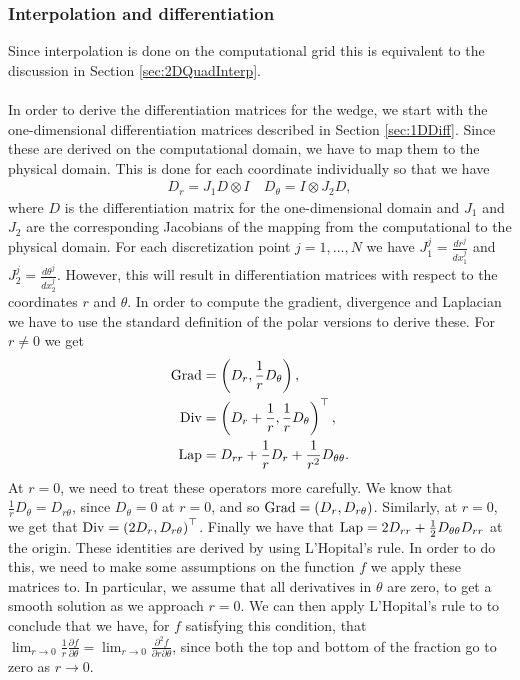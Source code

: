 \subsubsection*{Interpolation and differentiation}
Since interpolation is done on the computational grid this is equivalent to the discussion in Section \ref{sec:2DQuadInterp}.
\\
\\
In order to derive the differentiation matrices for the wedge, we start with the one-dimensional differentiation matrices described in Section \ref{sec:1DDiff}. Since these are derived on the computational domain, we have to map them to the physical domain. This is done for each coordinate individually so that we have
\begin{align*}
	D_r = J_1D \otimes I \quad 	D_\theta =I \otimes J_2D,
\end{align*} 
where $D$ is the differentiation matrix for the one-dimensional domain and $J_1$ and $J_2$  are the corresponding Jacobians of the mapping from the computational to the physical domain. For each discretization point $j = 1,...,N$ we have $ J_1^j= \frac{dr^j}{dx_1^j}$ and $J_2^j = \frac{d\theta^j}{dx_2^j}$.
However, this will result in differentiation matrices with respect to the coordinates $r$ and $\theta$. In order to compute the gradient, divergence and Laplacian we have to use the standard definition of the polar versions to derive these. For $ r \neq 0$ we get
\begin{align*}
	\operatorname{Grad}  &= \left(D_r, \frac{1}{r} D_\theta\right) ,\\
	\operatorname{Div} &= \left(D_r + \frac{1}{r}, \frac{1}{r} D_\theta\right)^\top ,\\
	\operatorname{Lap}  &= D_{rr} +\frac{1}{r}D_r +  \frac{1}{r^2} D_{\theta \theta}.
\end{align*}
At $ r = 0$, we need to treat these operators more carefully. We know that $\frac{1}{r} D_\theta = D_{r\theta}$, since $D_\theta =0$ at $r = 0$, and so $ \operatorname{Grad} = \left(D_r, D_{r\theta}\right)$. Similarly, at $r = 0$, we get that $\operatorname{Div} = \left(2D_r, D_{r\theta}\right)^\top$. Finally we have that $\operatorname{Lap} = 2 D_{rr} + \frac{1}{2} D_{\theta\theta}D_{rr}$ at the origin.
These identities are derived by using L'Hopital's rule. In order to do this, we need to make some assumptions on the function $f$ we apply these matrices to. In particular, we assume that all derivatives in $\theta$ are zero, to get a smooth solution as we approach $r =0$. We can then apply L'Hopital's rule to to conclude that we have, for $f$ satisfying this condition, that $\displaystyle \lim_{r \to 0}\frac{1}{r} \frac{\partial f}{\partial \theta} = \lim_{r \to 0} \frac{\partial^2 f}{\partial r \partial \theta}$, since both the top and bottom of the fraction go to zero as $r \to 0$.

